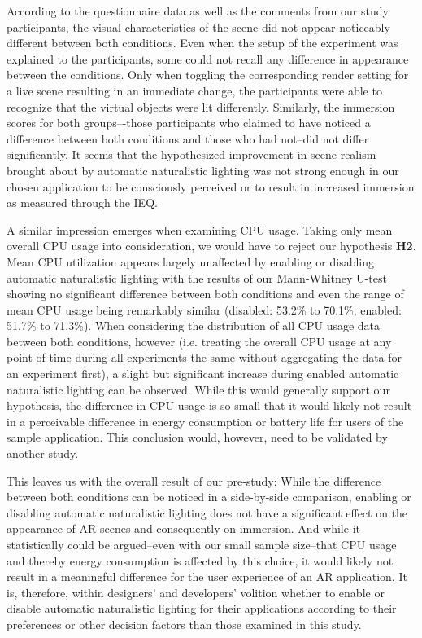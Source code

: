 \documentclass[12pt,twoside,english]{article}
\begin{document}
According to the questionnaire data as well as the comments from our study participants, the visual characteristics of the scene did not appear noticeably different between both conditions.
Even when the setup of the experiment was explained to the participants, some could not recall any difference in appearance between the conditions.
Only when toggling the corresponding render setting for a live scene resulting in an immediate change, the participants were able to recognize that the virtual objects were lit differently.
Similarly, the immersion scores for both groups–-those participants who claimed to have noticed a difference between both conditions and those who had not--did not differ significantly.
It seems that the hypothesized improvement in scene realism brought about by automatic naturalistic lighting was not strong enough in our chosen application to be consciously perceived or to result in increased immersion as measured through the \gls{IEQ}.

A similar impression emerges when examining \gls{CPU} usage.
Taking only mean overall \gls{CPU} usage into consideration, we would have to reject our hypothesis \textbf{H2}.
Mean \gls{CPU} utilization appears largely unaffected by enabling or disabling automatic naturalistic lighting with the results of our Mann-Whitney U-test showing no significant difference between both conditions and even the range of mean \gls{CPU} usage being remarkably similar (disabled: 53.2\% to 70.1\%; enabled: 51.7\% to 71.3\%).
When considering the distribution of all \gls{CPU} usage data between both conditions, however (i.e. treating the overall \gls{CPU} usage at any point of time during all experiments the same without aggregating the data for an experiment first), a slight but significant increase during enabled automatic naturalistic lighting can be observed.
While this would generally support our hypothesis, the difference in \gls{CPU} usage is so small that it would likely not result in a perceivable difference in energy consumption or battery life for users of the sample application.
This conclusion would, however, need to be validated by another study.

This leaves us with the overall result of our pre-study:
While the difference between both conditions can be noticed in a side-by-side comparison, enabling or disabling automatic naturalistic lighting does not have a significant effect on the appearance of \gls{AR} scenes and consequently on immersion.
And while it statistically could be argued--even with our small sample size--that \gls{CPU} usage and thereby energy consumption is affected by this choice, it would likely not result in a meaningful difference for the user experience of an \gls{AR} application.
It is, therefore, within designers' and developers' volition whether to enable or disable automatic naturalistic lighting for their applications according to their preferences or other decision factors than those examined in this study.
\end{document}
